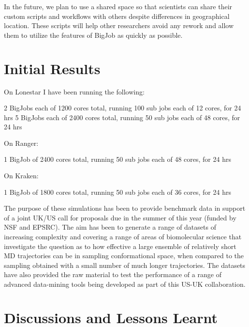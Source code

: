 \documentclass{sig-alternate}
\begin{document}
In the future, we plan to use a shared space so that scientists can share their 
custom scripts and workflows with others despite differences in geographical location. 
These scripts will help other researchers avoid any rework and allow them to utilize the features
of BigJob as quickly as possible. 

\section{Initial Results} 

On Lonestar I have been running the following:

2 BigJobs each of 1200 cores total, running 100 sub jobs each of 12 cores, for
24 hrs
5 BigJobs each of 2400 cores total, running 50 sub jobs each of 48 cores, for 24
hrs

On Ranger:

1 BigJob of 2400 cores total, running 50 sub jobs each of 48 cores, for 24 hrs

On Kraken:

1 BigJob of 1800 cores total, running 50 sub jobs each of 36 cores, for 24 hrs

The purpose of these simulations has been to provide benchmark data in support
of a joint UK/US call for proposals due in the summer of this year (funded by
NSF and EPSRC). The aim has been to generate a range of datasets of increasing
complexity and covering a range of areas of biomolecular science that
investigate the question as to how effective a large ensemble of relatively
short MD trajectories can be in sampling conformational space, when compared to
the sampling obtained with a small number of much longer trajectories. The
datasets have also provided the raw material to test the performance of a range
of advanced data-mining tools being developed as part of this US-UK
collaboration.



\section{Discussions and Lessons Learnt}
\end{document}
